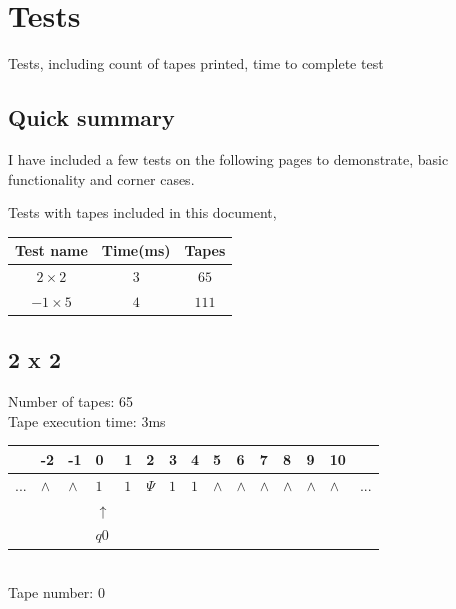 \documentclass[11pt]{article}
\begin{document}
\section{Tests}
Tests, including count of tapes printed, time to complete test
\subsection{Quick summary}
I have included a few tests on the following pages to demonstrate, basic functionality and corner cases.

\begin{table}[H]
\centering

Tests with tapes included in this document,  \\
\begin{tabular}{|c|c|c|}
\hline
Test name & Time(ms) & Tapes\\ \hline
$2 \times 2$ & $3$ & $65$ \\ \hline
$-1 \times 5$ & $4$ & $111$ \\ \hline
\end{tabular}
\end{table}

\pagebreak
\subsection{2 x 2}
Number of tapes: 65\\
Tape execution time: 3ms\\

\begin{table}[H]
\centering
\begin{tabular}{lllllllllllllll}
 & -2 & -1 & 0 & 1 & 2 & 3 & 4 & 5 & 6 & 7 & 8 & 9 & 10 & \\
\hline
$...$ & \multicolumn{1}{|l|}{$\wedge$} & \multicolumn{1}{|l|}{$\wedge$} & \multicolumn{1}{|l|}{$1$} & \multicolumn{1}{|l|}{$1$} & \multicolumn{1}{|l|}{$\Psi$} & \multicolumn{1}{|l|}{$1$} & \multicolumn{1}{|l|}{$1$} & \multicolumn{1}{|l|}{$\wedge$} & \multicolumn{1}{|l|}{$\wedge$} & \multicolumn{1}{|l|}{$\wedge$} & \multicolumn{1}{|l|}{$\wedge$} & \multicolumn{1}{|l|}{$\wedge$} & \multicolumn{1}{|l|}{$\wedge$} & $...$\\
\hline
&  &  & $\uparrow$ &  &  &  &  &  &  &  &  &  &  &  \\
&  &  & $ q0 $ &  &  &  &  &  &  &  &  &  &  &  \\
\end{tabular}
\\
Tape number: 0
\noindent\makebox[\linewidth]{\hdashrule{\textwidth}{1pt}{1pt}}\end{table}
\end{document}
